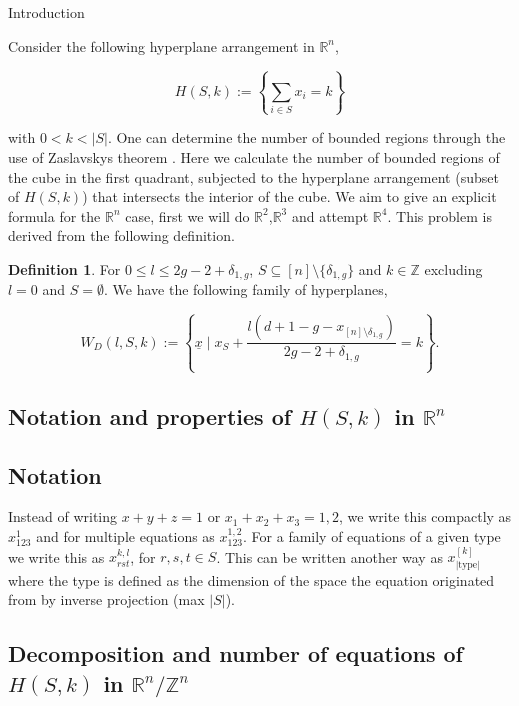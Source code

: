 \documentclass[a4paper,12pt]{article}
\theoremstyle{definition}
\newtheorem{definition}{Definition}[section]
\theoremstyle{indented}
\begin{document}
\begin{section}{Introduction}

Consider the following hyperplane arrangement in $\mathbb{R}^n$, 

\begin{equation}\label{HSK}
    H(S,k):= \left\{ \sum_{i\in S} x_i = k \right\}
\end{equation}

 
 with $0<k<|S|$. One can determine the number of bounded regions through the use of Zaslavskys theorem \cite[Lect 1,2]{stanley2004introduction}. Here we calculate the number of bounded regions of the cube in the first quadrant, subjected to the hyperplane arrangement (subset of $H(S,k)$) that intersects the interior of the cube. We aim to give an explicit formula for the $\mathbb{R}^n$ case, first we will do $\mathbb{R}^2$,$\mathbb{R}^3$ and attempt $\mathbb{R}^4$. This problem is derived from the following definition.
 
  \begin{definition}\label{planefam} \cite[Equation (27), page 21]{kass2019stability}  For $0\le l \le 2g-2 + \delta_{1,g}$, $S\subseteq [n] \setminus \{\delta_{1,g}\}$ and $k\in \mathbb{Z}$ excluding $l=0$ and $S=\emptyset$. We have the following family of hyperplanes,

$$W_D(l,S,k):= \left\{ \underline{x} \mid x_S + \frac{ l(d+1-g - x_{[n]\setminus{\delta_{1,g}} } ) } {2g-2+\delta_{1,g}} = k \right\}. $$
\end{definition}

\section{Notation and properties of $H(S,k)$ in $\mathbb{R}^n$}

\subsection{Notation}

Instead of writing $x+y+z=1$ or $x_1 +x_2+x_3=1,2$, we write this compactly as $x_{123}^1$ and for multiple equations as $x_{123}^{1,2}$. For a family of equations of a given type we write this as $x_{rst}^{k,l}$, for $r,s,t \in S$. This can be written another way as $x_{|\text{type}|} ^{[k]}$ where the type is defined as the dimension of the space the equation originated from by inverse projection (max $|S|$). 

 

 \subsection{Decomposition and number of equations of $H(S,k)$ in $\mathbb{R}^n/\mathbb{Z}^n$}


\end{section}
\end{document}
